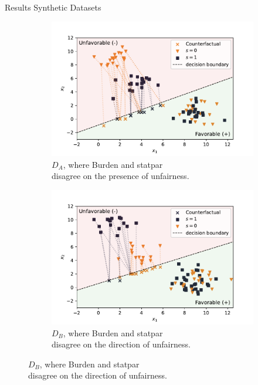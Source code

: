 \documentclass[handout,aspectratio=169]{beamer}
\begin{document}
\begin{frame}{Results Synthetic Datasets}
\begin{figure}
    \centering
    \begin{subfigure}{0.49\textwidth}
        \includegraphics[width=\textwidth]{img/syndata-A}
        \caption{$D_A$, where Burden and statpar \\ disagree on the presence of unfairness.}
        \label{fig:syndatafavor}
    \end{subfigure}
    \begin{subfigure}{0.49\textwidth}
        \includegraphics[width=\textwidth]{img/syndata-B}
        \caption{$D_B$, where Burden and statpar \\ disagree on the direction of unfairness.}
        \label{fig:syndataunfavor}
    \end{subfigure}
\end{figure}
\end{frame}
\end{document}
